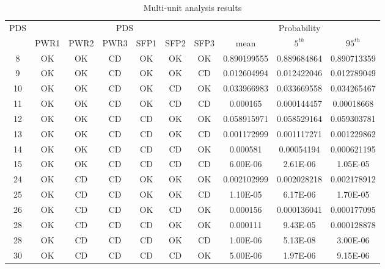 \begin{table}
  \centering
  \begin{tabular}{c|cccccc|ccc}
    \hline
    PDS & \multicolumn{6}{c}{PDS} & \multicolumn{3}{c}{Probability}   \\
    \cline{2-10}
         & PWR1 & PWR2 & PWR3 & SFP1 & SFP2 & SFP3 & mean & $5^{th}$ & $95^{th}$     \\
    \hline \hline
     8    & OK   & OK   & CD   & OK   & OK   & OK   & 0.890199555 & 0.889684864 & 0.890713359 \\
     9    & OK   & OK   & CD   & OK   & OK   & CD   & 0.012604994 & 0.012422046 & 0.012789049 \\
     10   & OK   & OK   & CD   & OK   & CD   & OK   & 0.033966983 & 0.033669558 & 0.034265467 \\
     11   & OK   & OK   & CD   & OK   & CD   & CD   & 0.000165    & 0.000144457 & 0.00018668  \\
     12   & OK   & OK   & CD   & CD   & OK   & OK   & 0.058915971 & 0.058529164 & 0.059303781 \\
     13   & OK   & OK   & CD   & CD   & OK   & CD   & 0.001172999 & 0.001117271 & 0.001229862 \\
     14   & OK   & OK   & CD   & CD   & CD   & OK   & 0.000581    & 0.00054194  & 0.000621195 \\
     15   & OK   & OK   & CD   & CD   & CD   & CD   & 6.00E-06    & 2.61E-06    & 1.05E-05    \\
     24   & OK   & CD   & CD   & OK   & OK   & OK   & 0.002102999 & 0.002028218 & 0.002178912 \\
     25   & OK   & CD   & CD   & OK   & OK   & CD   & 1.10E-05    & 6.17E-06    & 1.70E-05    \\
     26   & OK   & CD   & CD   & OK   & CD   & OK   & 0.000156    & 0.000136041 & 0.000177095 \\
     28   & OK   & CD   & CD   & CD   & OK   & OK   & 0.000111    & 9.43E-05    & 0.000128878 \\
     28   & OK   & CD   & CD   & CD   & OK   & CD   & 1.00E-06    & 5.13E-08    & 3.00E-06    \\
     30   & OK   & CD   & CD   & CD   & CD   & OK   & 5.00E-06    & 1.97E-06    & 9.15E-06    \\
    \hline
  \end{tabular}
  \caption{Multi-unit analysis results}
  \label{tab:resultsMain}
\end{table}


